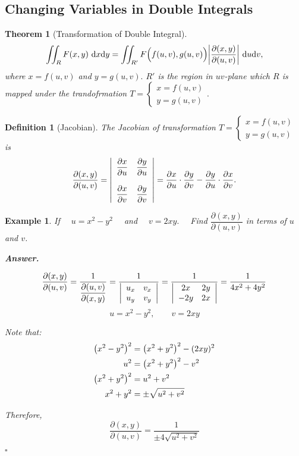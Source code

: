 \documentclass[12pt,a4paper]{article}
\newtheorem{thm}{Theorem}[subsection]
\newtheorem{df}{Definition}[subsection]
\newtheorem{eg}{Example}[subsection]
\newenvironment*{ans}{\par\indent\textbf{\textit{Answer. }}\par}{\par\hfill{$\square$}\par}
\def\dsst{\displaystyle}
\def\d{{\mathrm{d}}}
\def\dx{\d x}
\def\del{\partial}
\def\iintR{\dsst\iint_R}
\begin{document}
\subsection{Changing Variables in Double Integrals}
\begin{thm}[Transformation of Double Integral]
	\[\iintR F(x,y)\ \dx\d y=\iint_{R'} F\qty\Big(f(u,v), g(u,v))\qty|\dfrac{\del(x,y)}{\del(u,v)}|\ \d u\d v,\] where $x=f(u,v)$ and $y=g(u,v).$ $R'$ is the region in $uv$-plane which $R$ is mapped under the trandofrmation $T=\begin{cases}x=f(u,v)\\y=g(u,v)\end{cases}.$	
\end{thm}
\begin{df}[Jacobian]
	The Jacobian of transformation 	$T=\begin{cases}x=f(u,v)\\y=g(u,v)\end{cases}$ is \[\dfrac{\del(x,y)}{\del(u,v)}=\qty|\begin{array}{cc}\dfrac{\del x}{\del u}&\dfrac{\del y}{\del u}\\\\\dfrac{\del x}{\del v}&\dfrac{\del y}{\del v}\end{array}|=\dfrac{\del x}{\del u}\cdot\dfrac{\del y}{\del v}-\dfrac{\del y}{\del u}\cdot\dfrac{\del x}{\del v}.\]
\end{df}
\begin{eg}
	If $\quad u=x^2-y^2\quad$ and $\quad v=2xy.\quad$ Find $\dsst\dfrac{\del(x,y)}{\del(u,v)}$ in terms of $u$ and $v$. 
	\begin{ans}
		\[\dfrac{\del(x,y)}{\del(u,v)}=\dfrac{1}{\dfrac{\del(u,v)}{\del(x,y)}}=\dfrac{1}{\qty|\begin{array}{cc}u_x&v_x\\u_y&v_y\end{array}|}=\dfrac{1}{\qty|\begin{array}{cc}2x&2y\\-2y&2x\end{array}|}=\dfrac{1}{4x^2+4y^2}\] \[u=x^2-y^2,\qquad v=2xy\]\par Note that: \[\begin{aligned}\qty(x^2-y^2)^2&=\qty(x^2+y^2)^2-(2xy)^2\\u^2&=\qty(x^2+y^2)^2-v^2\\\qty(x^2+y^2)^2 &=u^2+v^2\\x^2+y^2&=\pm\sqrt{u^2+v^2}\end{aligned}\]\par Therefore, \[\dfrac{\del(x,y)}{\del(u,v)}=\dfrac{1}{\pm4\sqrt{u^2+v^2}}\]
	\end{ans}
\end{eg}
\end{document}
